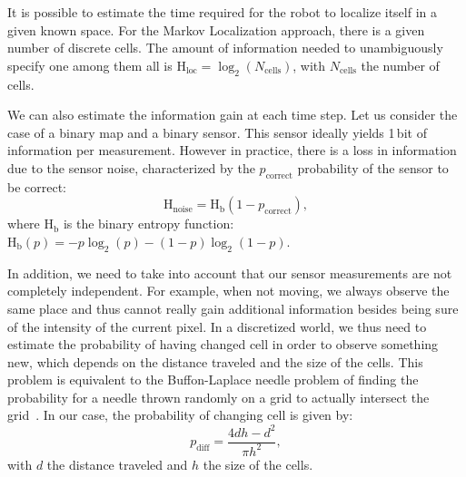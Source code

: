 \documentclass{svmult}
\newcommand{\ent}[1]{\mathrm{H}_\mathrm{#1}} %
\begin{document}
It is possible to estimate the time required for the robot to localize itself in a given known space.
For the Markov Localization approach, there is a given number of discrete cells.
The amount of information needed to unambiguously specify one among them all is $\ent{loc} = \log_2(N_\mathrm{cells})$, with $N_\mathrm{cells}$ the number of cells.

We can also estimate the information gain at each time step.
Let us consider the case of a binary map and a binary sensor.
This sensor ideally yields 1\,bit of information per measurement.
However in practice, there is a loss in information due to the sensor noise, characterized by the $p_\mathrm{correct}$ probability of the sensor to be correct:
\begin{equation}
	\ent{noise} = \ent{b}(1 - p_\mathrm{correct}),
\end{equation}
where $\ent{b}$ is the binary entropy function: $\ent{b}(p) = -p\log_2(p) - (1-p)\log_2(1-p)$.

In addition, we need to take into account that our sensor measurements are not completely independent.
For example, when not moving, we always observe the same place and thus cannot really gain additional information besides being sure of the intensity of the current pixel.
In a discretized world, we thus need to estimate the probability of having changed cell in order to observe something new, which depends on the distance traveled and the size of the cells.
This problem is equivalent to the Buffon-Laplace needle problem of finding the probability for a needle thrown randomly on a grid to actually intersect the grid~\cite{laplace1820prob}.
In our case, the probability of changing cell is given by:
\begin{equation}
	p_\mathrm{diff} = \frac{4d h - d^2}{\pi h^2},
\end{equation}
with $d$ the distance traveled and $h$ the size of the cells.
\end{document}

